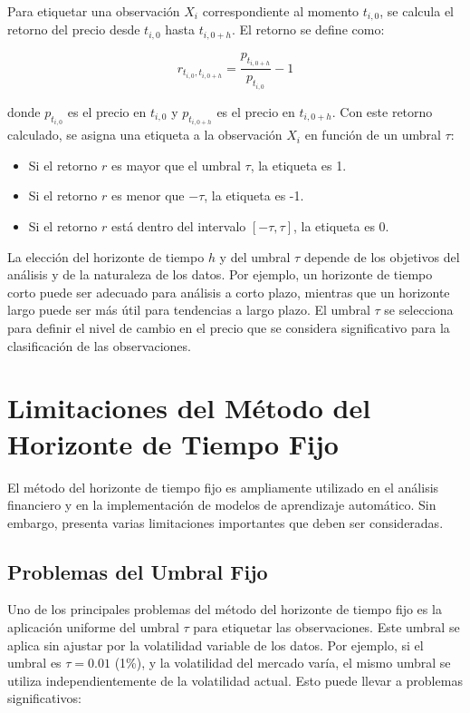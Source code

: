 \documentclass[a4paper,12pt]{report}
\begin{document}
Para etiquetar una observación \(X_i\) correspondiente al momento \(t_{i,0}\), se calcula el retorno del precio desde \(t_{i,0}\) hasta \(t_{i,0 + h}\). El retorno se define como:

\[
r_{t_{i,0}, t_{i,0 + h}} = \frac{p_{t_{i,0 + h}}}{p_{t_{i,0}}} - 1
\]

donde \(p_{t_{i,0}}\) es el precio en \(t_{i,0}\) y \(p_{t_{i,0 + h}}\) es el precio en \(t_{i,0 + h}\). Con este retorno calculado, se asigna una etiqueta a la observación \(X_i\) en función de un umbral \(\tau\):

\begin{itemize}
    \item Si el retorno \(r\) es mayor que el umbral \(\tau\), la etiqueta es 1.
    \item Si el retorno \(r\) es menor que \(-\tau\), la etiqueta es -1.
    \item Si el retorno \(r\) está dentro del intervalo \([- \tau, \tau]\), la etiqueta es 0.
\end{itemize}

La elección del horizonte de tiempo \(h\) y del umbral \(\tau\) depende de los objetivos del análisis y de la naturaleza de los datos. Por ejemplo, un horizonte de tiempo corto puede ser adecuado para análisis a corto plazo, mientras que un horizonte largo puede ser más útil para tendencias a largo plazo. El umbral \(\tau\) se selecciona para definir el nivel de cambio en el precio que se considera significativo para la clasificación de las observaciones.

\section{Limitaciones del Método del Horizonte de Tiempo Fijo}

El método del horizonte de tiempo fijo es ampliamente utilizado en el análisis financiero y en la implementación de modelos de aprendizaje automático. Sin embargo, presenta varias limitaciones importantes que deben ser consideradas.

\subsection{Problemas del Umbral Fijo}

Uno de los principales problemas del método del horizonte de tiempo fijo es la aplicación uniforme del umbral \(\tau\) para etiquetar las observaciones. Este umbral se aplica sin ajustar por la volatilidad variable de los datos. Por ejemplo, si el umbral es \(\tau = 0.01\) (1\%), y la volatilidad del mercado varía, el mismo umbral se utiliza independientemente de la volatilidad actual. Esto puede llevar a problemas significativos:
\end{document}
